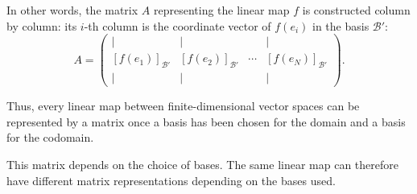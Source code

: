 In other words, the matrix $A$ representing the linear map $f$ is constructed column
by column: its $i$-th column is the coordinate vector of $f(e_i)$ in the basis
$\mathcal{B}'$:
\[
A
=
\begin{pmatrix}
| & | &        & | \\
[f(e_1)]_{\mathcal{B}'} & [f(e_2)]_{\mathcal{B}'} & \cdots & [f(e_N)]_{\mathcal{B}'} \\
| & | &        & |
\end{pmatrix}.
\]

Thus, every linear map between finite-dimensional vector spaces can be
represented by a matrix once a basis has been chosen for the domain
and a basis for the codomain.

This matrix depends on the choice of bases. The same linear
map can therefore have different matrix representations depending on the bases used.
